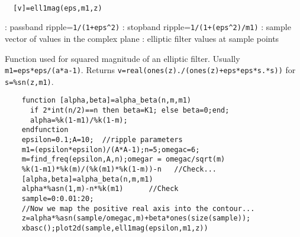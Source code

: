 
\begin{mandesc}
   \\ %
\end{mandesc}
\begin{calling_sequence}
\begin{verbatim}
  [v]=ell1mag(eps,m1,z)  
\end{verbatim}
\end{calling_sequence}
\begin{parameters}
  \begin{varlist}
    : passband ripple=\verb!1/(1+eps^2)!
    : stopband ripple=\verb!1/(1+(eps^2)/m1)!
    : sample vector of values in the complex plane
    : elliptic filter values at sample points
  \end{varlist}
\end{parameters}
\begin{mandescription}
  Function used for squared magnitude of an elliptic filter.
  Usually \verb!m1=eps*eps/(a*a-1)!. Returns 
  \verb!v=real(ones(z)./(ones(z)+eps*eps*s.*s))! for \verb!s=%sn(z,m1)!.
\end{mandescription}
\begin{examples}
  \begin{Verbatim}
    function [alpha,beta]=alpha_beta(n,m,m1)
      if 2*int(n/2)==n then beta=K1; else beta=0;end;
      alpha=%k(1-m1)/%k(1-m);
    endfunction
    epsilon=0.1;A=10;  //ripple parameters
    m1=(epsilon*epsilon)/(A*A-1);n=5;omegac=6;
    m=find_freq(epsilon,A,n);omegar = omegac/sqrt(m)
    %k(1-m1)*%k(m)/(%k(m1)*%k(1-m))-n   //Check...
    [alpha,beta]=alpha_beta(n,m,m1)
    alpha*%asn(1,m)-n*%k(m1)      //Check
    sample=0:0.01:20;
    //Now we map the positive real axis into the contour...
    z=alpha*%asn(sample/omegac,m)+beta*ones(size(sample));
    xbasc();plot2d(sample,ell1mag(epsilon,m1,z))
  \end{Verbatim}
\end{examples}
\begin{manseealso}
\end{manseealso}
